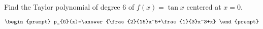 \documentclass{ximera}
\author{Gregory Hartman \and Matthew Carr}
\begin{document}
\begin{exercise}




Find the Taylor polynomial of degree $6$ of $f(x)=\tan x$ centered at $x=0$.

\[
\begin{prompt}
p_{6}(x)=\answer{\frac{2}{15}x^5+\frac{1}{3}x^3+x}
\end{prompt}
\]

\end{exercise}
\end{document}
